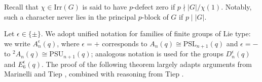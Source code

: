 \documentclass[10pt]{article}
\begin{document}
Recall that $\chi\in \mathrm{Irr}(G)$ is said to have $p$-defect zero if $p\nmid |G|/\chi(1)$.
Notably, such a character never lies in the principal $p$-block of $G$ if $p\mid |G|$.



Let $\epsilon\in \{ \pm \}$.
We adopt unified notation for families of finite groups of Lie type:
we write $A_n^\epsilon(q)$, where $\epsilon=+$ corresponds to $A_n(q)\cong\mathrm{PSL}_{n+1}(q)$ and $\epsilon=-$ to ${}^{2}\!A_n(q)\cong\mathrm{PSU}_{n+1}(q)$;
analogous notation is used for the groups $D_{n}^{\epsilon}(q)$ and $E_{6}^{\epsilon}(q)$.
The proof of the following theorem largely adapts arguments from Marinelli and Tiep \cite[Section 4]{marinelli13}, combined with reasoning from Tiep \cite[Proposition 6.3]{tiep15}.
\end{document}
